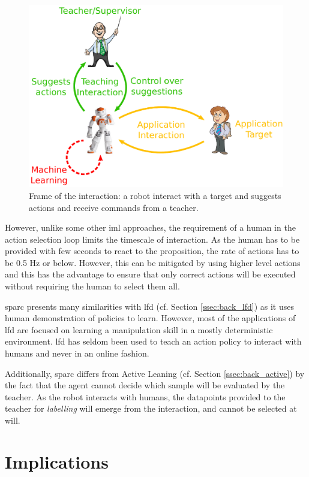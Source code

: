 \begin{figure}[ht]
	\includegraphics[width=.8\linewidth]{frame.pdf}
	\centering
	\caption{Frame of the interaction: a robot interact with a target and suggests actions and receive commands from a teacher.}
	\label{fig:frame}
\end{figure}

However, unlike some other \gls{iml} approaches, the requirement of a human in the action selection loop limits the timescale of interaction. As the human has to be provided with few seconds to react to the proposition, the rate of actions has to be 0.5 Hz or below. However, this can be mitigated by using higher level actions and this has the advantage to ensure that only correct actions will be executed without requiring the human to select them all.

\gls{sparc} presents many similarities with \acrlong{lfd} (cf. Section \ref{ssec:back_lfd}) as it uses human demonstration of policies to learn. However, most of the applications of \gls{lfd} \citep{argall2009survey,billard2008robot} are focused on learning a manipulation skill in a mostly deterministic environment. \gls{lfd} has seldom been used to teach an action policy to interact with humans \citep{liu2014train,sequeira2016discovering} and never in an online fashion.

Additionally, \gls{sparc} differs from Active Leaning (cf. Section \ref{ssec:back_active}) by the fact that the agent cannot decide which sample will be evaluated by the teacher. As the robot interacts with humans, the datapoints provided to the teacher for \textit{labelling} will emerge from the interaction, and cannot be selected at will. 
    
\section{Implications}

